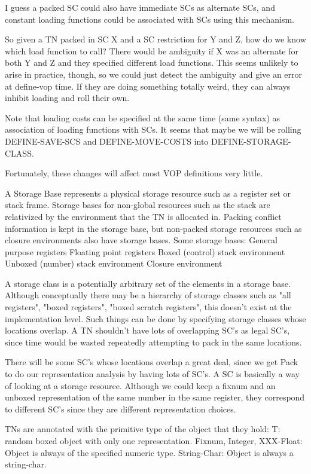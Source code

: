 I guess a packed SC could also have immediate SCs as alternate SCs, and
constant loading functions could be associated with SCs using this mechanism.

So given a TN packed in SC X and a SC restriction for Y and Z, how do we know
which load function to call?  There would be ambiguity if X was an alternate
for both Y and Z and they specified different load functions.  This seems
unlikely to arise in practice, though, so we could just detect the ambiguity
and give an error at define-vop time.  If they are doing something totally
weird, they can always inhibit loading and roll their own.

Note that loading costs can be specified at the same time (same syntax) as
association of loading functions with SCs.  It seems that maybe we will be
rolling DEFINE-SAVE-SCS and DEFINE-MOVE-COSTS into DEFINE-STORAGE-CLASS.

Fortunately, these changes will affect most VOP definitions very little.


A Storage Base represents a physical storage resource such as a register set or
stack frame.  Storage bases for non-global resources such as the stack are
relativized by the environment that the TN is allocated in.  Packing conflict
information is kept in the storage base, but non-packed storage resources such
as closure environments also have storage bases.
Some storage bases:
    General purpose registers
    Floating point registers
    Boxed (control) stack environment
    Unboxed (number) stack environment
    Closure environment

A storage class is a potentially arbitrary set of the elements in a storage
base.  Although conceptually there may be a hierarchy of storage classes such
as "all registers", "boxed registers", "boxed scratch registers", this doesn't
exist at the implementation level.  Such things can be done by specifying
storage classes whose locations overlap.  A TN shouldn't have lots of
overlapping SC's as legal SC's, since time would be wasted repeatedly
attempting to pack in the same locations.

There will be some SC's whose locations overlap a great deal, since we get Pack
to do our representation analysis by having lots of SC's.  A SC is basically a
way of looking at a storage resource.  Although we could keep a fixnum and an
unboxed representation of the same number in the same register, they correspond
to different SC's since they are different representation choices.

TNs are annotated with the primitive type of the object that they hold:
    T: random boxed object with only one representation.
    Fixnum, Integer, XXX-Float: Object is always of the specified numeric type.
    String-Char: Object is always a string-char.

